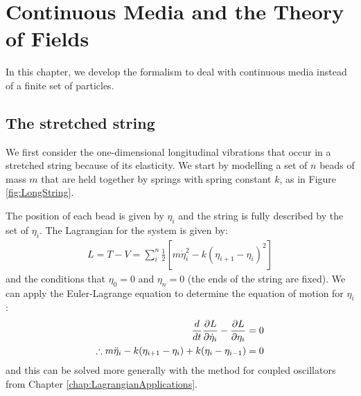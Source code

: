 %
\chapter{Continuous Media and the Theory of Fields}
In this chapter, we develop the formalism to deal with continuous media instead of a finite set of particles. 

\section{The stretched string}
We first consider the one-dimensional longitudinal vibrations that occur in a stretched string because of its elasticity. We start by modelling a set of $n$ beads of mass $m$ that are held together by springs with spring constant $k$, as in Figure \ref{fig:LongString}.

The position of each bead is given by $\eta_i$ and the string is fully described by the set of $\eta_i$. The Lagrangian for the system is given by:
\begin{align}
L=T-V=\sum_i^n \frac{1}{2}\left[m\dot\eta_i^2-k(\eta_{i+1}-\eta_i)^2\right]
\end{align}
and the conditions that $\eta_0=0$ and $\eta_n=0$ (the ends of the string are fixed). We can apply the Euler-Lagrange equation to determine the equation of motion for $\eta_i$:
\begin{align}
\frac{d}{dt}\frac{\partial L}{\partial \dot\eta_i}-\frac{\partial L}{\partial \eta_i}&=0\nonumber\\
\therefore m\ddot\eta_i-k(\eta_{i+1}-\eta_i)+k(\eta_i-\eta_{i-1})&=0
\end{align}
and this can be solved more generally with the method for coupled oscillators from Chapter \ref{chap:LagrangianApplications}.


